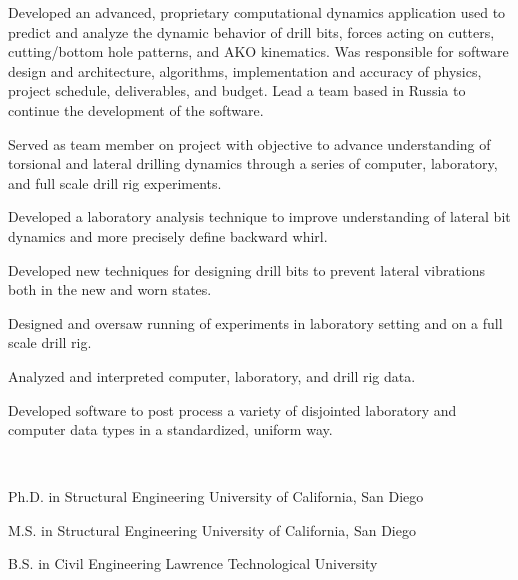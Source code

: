 \documentclass{leresume}
\begin{document}
		\begin{bulletedlist}
			
		\item
					Developed an advanced, proprietary computational dynamics application used to predict and analyze the dynamic behavior of drill bits, forces acting on cutters, cutting/bottom hole patterns, and AKO kinematics.  Was responsible for software design and architecture, algorithms, implementation and accuracy of physics, project schedule, deliverables, and budget.  Lead a team based in Russia to continue the development of the software.
		\item Served as team member on project with objective to advance understanding of torsional and lateral drilling dynamics through a series of computer, laboratory, and full scale drill rig experiments.
		\item Developed a laboratory analysis technique to improve understanding of lateral bit dynamics and more precisely define backward whirl.
		\item Developed new techniques for designing drill bits to prevent lateral vibrations both in the new and worn states.
		\item Designed and oversaw running of experiments in laboratory setting and on a full scale drill rig.
		\item Analyzed and interpreted computer, laboratory, and drill rig data.
		\item Developed software to post process a variety of disjointed laboratory and computer data types in a standardized, uniform way.
		\end{bulletedlist}
			\vspace*{-12pt}
	\hspace*{0pt}\\ \vspace*{-2pt}
				
		\vspace*{-8pt}
	

	
                {Ph.D. in Structural Engineering}
                {University of California, San Diego}
		
                {M.S. in Structural Engineering}
                {University of California, San Diego}
		
                {B.S. in Civil Engineering}
                {Lawrence Technological University}
		
\end{document}
